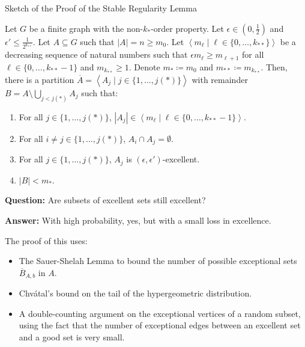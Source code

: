 \documentclass{beamer}
\newcommand{\parcurly}[1]{\{ #1 \}}
\newcommand{\parround}[1]{( #1 )}
\newcommand{\Partriangle}[1]{\left< #1 \right>}
\begin{document}
\begin{frame}{Sketch of the Proof of the Stable Regularity Lemma}
    \begin{lemma} \label{lem:existance_of_excellent_partition}
        Let $G$ be a finite graph with the non-$k_{*}$-order property.
        Let $\epsilon \in \parround{0, \frac{1}{2}}$ and $\epsilon' \leq \frac{1}{2^{k_{**}}}$.
        Let $A \subseteq G$ such that $|A| = n \geq m_0$.
        Let $\Partriangle{m_\ell \mid \ell \in \parcurly{0, \dots, k_{**}}}$ be a decreasing sequence of natural numbers such that
        $\epsilon m_{\ell} \geq m_{\ell+1}$ for all $\ell \in \parcurly{0, \dots, k_{**}-1}$ and $m_{k_{**}} \geq 1$.
        Denote $m_* \coloneqq m_0$ and $m_{**} \coloneqq m_{k_{**}}$.
        Then, there is a partition $\overline{A} = \Partriangle{A_j \mid j \in \parcurly{1, \dots, j(*)}}$ with remainder
        $B = A \setminus \bigcup_{j < j(*)} A_j$ such that:
        \begin{enumerate}
            \item For all $j \in \parcurly{1, \dots, j(*)}$, $|A_j| \in \Partriangle{m_\ell \mid \ell \in \parcurly{0, \dots, k_{**}-1}}$.
            \item For all $i \neq j \in \parcurly{1, \dots, j(*)}$, $A_i \cap A_j = \emptyset$.
            \item For all $j \in \parcurly{1, \dots, j(*)}$, $A_j$ is $\parround{\epsilon, \epsilon'}$-excellent.
            \item $|B| < m_*$.
        \end{enumerate}
    \end{lemma}
\end{frame}

\begin{frame}
     {
        \textbf{Question:} Are subsets of excellent sets still excellent?
        \newline
    }

     {
        \textbf{Answer:} With high probability, yes, but with a small loss in excellence.
        \newline
    }

     {
        The proof of this uses:
        \begin{itemize}
            \item The Sauer-Shelah Lemma to bound the number of possible exceptional sets $\overline{B}_{A,b}$ in $A$.
            \item Chvátal's bound on the tail of the hypergeometric distribution.
            \item A double-counting argument on the exceptional vertices of a random subset, using the fact that the number of
                exceptional edges between an excellent set and a good set is very small.
        \end{itemize}
    }
\end{frame}
\end{document}
